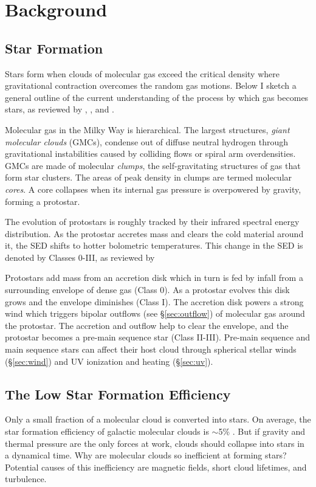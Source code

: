 \section{Background}\label{sec:bkgrd}

\subsection{Star Formation}\label{sec:sf}
Stars form when clouds of molecular gas exceed the critical density where gravitational contraction overcomes the random gas motions. Below I sketch a general outline of the current understanding of the process by which gas becomes stars, as reviewed by \cite{McKee_2007}, \cite{Draine11}, and \cite{Dunham_2014}. 

Molecular gas in the Milky Way is hierarchical. The largest structures, \textit{giant molecular clouds} (GMCs), condense out of diffuse neutral hydrogen through gravitational instabilities caused by colliding flows or spiral arm overdensities. GMCs are made of molecular \textit{clumps}, the self-gravitating structures of gas that form star clusters. The areas of peak density in clumps are termed molecular \textit{cores}. A core collapses when its internal gas pressure is overpowered by gravity, forming a protostar.

The evolution of protostars is roughly tracked by their infrared spectral energy distribution. As the protostar accretes mass and clears the cold material around it, the SED shifts to hotter bolometric temperatures. This change in the SED is denoted by Classes 0-III, as reviewed by \cite{Andre00}

Protostars add mass from an accretion disk which in turn is fed by infall from a surrounding envelope of dense gas (Class 0). As a protostar evolves this disk grows and the envelope diminishes (Class I). The accretion disk powers a strong wind which triggers bipolar outflows (see \S\ref{sec:outflow}) of molecular gas around the protostar. The accretion and outflow help to clear the envelope, and the protostar becomes a pre-main sequence star (Class II-III). Pre-main sequence and main sequence stars can affect their host cloud through spherical stellar winds (\S\ref{sec:wind}) and UV ionization and heating (\S\ref{sec:uv}).

\subsection{The Low Star Formation Efficiency}\label{sec:sfe}
Only a small fraction of a molecular cloud is converted into stars. On average, the star formation efficiency of galactic molecular clouds is $\sim$5\% \cite{McKee_2007}. But if gravity and thermal pressure are the only forces at work, clouds should collapse into stars in a dynamical time. Why are molecular clouds so inefficient at forming stars? Potential causes of this inefficiency are magnetic fields, short cloud lifetimes, and turbulence. 

